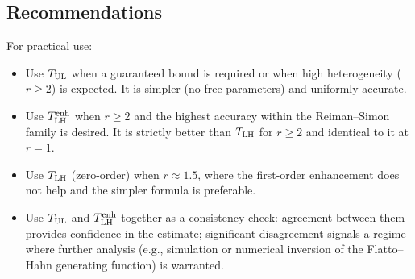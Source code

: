 \subsection{Recommendations}

For practical use:
\begin{itemize}
\item Use $T_{\text{UL}}$ when a guaranteed bound is required or when high heterogeneity
      ($r \geq 2$) is expected. It is simpler (no free parameters) and
      uniformly accurate.
\item Use $T_{\text{LH}}^{\text{enh}}$ when $r \geq 2$ and the highest accuracy within the
      Reiman--Simon family is desired. It is strictly better than $T_{\text{LH}}$
      for $r \geq 2$ and identical to it at $r = 1$.
\item Use $T_{\text{LH}}$ (zero-order) when $r \approx 1.5$, where the first-order
      enhancement does not help and the simpler formula is preferable.
\item Use $T_{\text{UL}}$ and $T_{\text{LH}}^{\text{enh}}$ together as a consistency check: agreement
      between them provides confidence in the estimate; significant
      disagreement signals a regime where further analysis
      (e.g., simulation or numerical inversion of the Flatto--Hahn generating
      function) is warranted.
\end{itemize}

